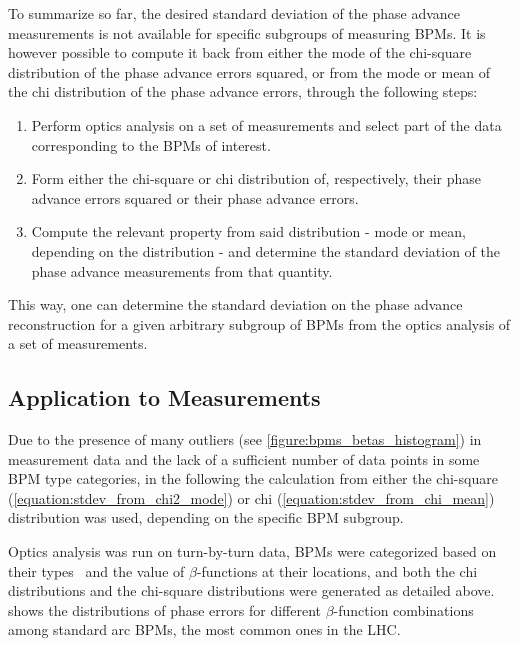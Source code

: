 To summarize so far, the desired standard deviation of the phase advance measurements is not available for specific subgroups of measuring BPMs.
It is however possible to compute it back from either the mode of the chi-square distribution of the phase advance errors squared, or from the mode or mean of the chi distribution of the phase advance errors, through the following steps:
\begin{enumerate}
    \item Perform optics analysis on a set of measurements and select part of the data corresponding to the BPMs of interest.
    \item Form either the chi-square or chi distribution of, respectively, their phase advance errors squared or their phase advance errors.
    \item Compute the relevant property from said distribution - mode or mean, depending on the distribution - and determine the standard deviation of the phase advance measurements from that quantity.
\end{enumerate}
This way, one can determine the standard deviation on the phase advance reconstruction for a given arbitrary subgroup of BPMs from the optics analysis of a set of measurements.

\subsection*{Application to Measurements}

Due to the presence of many outliers (see \cref{figure:bpms_betas_histogram}) in measurement data and the lack of a sufficient number of data points in some BPM type categories, in the following the calculation from either the chi-square (\cref{equation:stdev_from_chi2_mode}) or chi (\cref{equation:stdev_from_chi_mean}) distribution was used, depending on the specific BPM subgroup.

Optics analysis was run on turn-by-turn data, BPMs were categorized based on their types~\cite{CERN:Equipment_Codes} and the value of \(\beta\)-functions at their locations, and both the chi distributions and the chi-square distributions were generated as detailed above.
 shows the distributions of phase errors for different \(\beta\)-function combinations among standard arc BPMs, the most common ones in the LHC.

